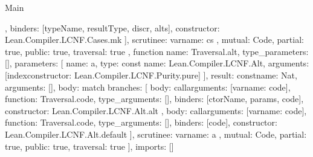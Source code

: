 \begin{lexlean}{Main}
\begin{toolingmodule}
{{{{{            },
            binders: [typeName, resultType, discr, alts],
            constructor: Lean.Compiler.LCNF.Cases.mk
          }
        ],
        scrutinee: var{name: cs}
      },
      mutual: Code,
      partial: true,
      public: true,
      traversal: true
    },
    function{
      name: Traversal.alt,
      type_parameters: [],
      parameters: [
        {
          name: a,
          type: const{
            name: Lean.Compiler.LCNF.Alt,
            arguments: [index{constructor: Lean.Compiler.LCNF.Purity.pure}]
          }
        }
      ],
      result: const{name: Nat, arguments: []},
      body: match{
        branches: [
          {
            body: call{arguments: [var{name: code}], function: Traversal.code, type_arguments: []},
            binders: [ctorName, params, code],
            constructor: Lean.Compiler.LCNF.Alt.alt
          },
          {
            body: call{arguments: [var{name: code}], function: Traversal.code, type_arguments: []},
            binders: [code],
            constructor: Lean.Compiler.LCNF.Alt.default
          }
        ],
        scrutinee: var{name: a}
      },
      mutual: Code,
      partial: true,
      public: true,
      traversal: true
    }
  ],
  imports: []
}
\end{toolingmodule}
\end{lexlean}
